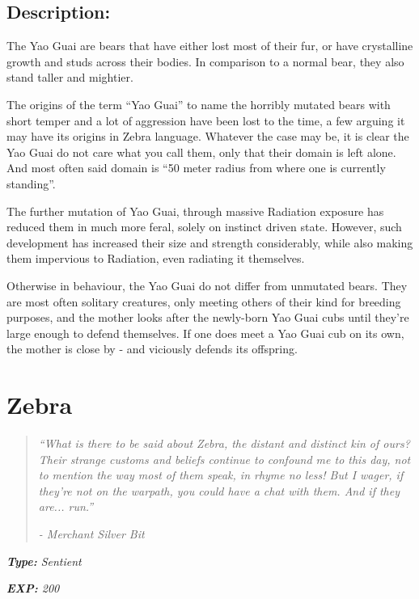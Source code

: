 \documentclass[11pt,a4paper,twocolumn]{book}
\begin{document}
	\subsection*{Description:}
	The Yao Guai are bears that have either lost most of their fur, or have crystalline growth and studs across their bodies. In comparison to a normal bear, they also stand taller and mightier.
	
	The origins of the term ``Yao Guai'' to name the horribly mutated bears with short temper and a lot of aggression have been lost to the time, a few arguing it may have its origins in Zebra language. Whatever the case may be, it is clear the Yao Guai do not care what you call them, only that their domain is left alone. And most often said domain is ``50 meter radius from where one is currently standing''. 
	
	The further mutation of Yao Guai, through massive Radiation exposure has reduced them in much more feral, solely on instinct driven state. However, such development has increased their size and strength considerably, while also making them impervious to Radiation, even radiating it themselves.
	
	Otherwise in behaviour, the Yao Guai do not differ from unmutated bears. They are most often solitary creatures, only meeting others of their kind for breeding purposes, and the mother looks after the newly-born Yao Guai cubs until they're large enough to defend themselves. If one does meet a Yao Guai cub on its own, the mother is close by - and viciously defends its offspring.
	
	\clearpage
	
	\section*{Zebra}
	\begin{quote}
		\emph{``What is there to be said about Zebra, the distant and distinct kin of ours? Their strange customs and beliefs continue to confound me to this day, not to mention the way most of them speak, in rhyme no less! But I wager, if they're not on the warpath, you could have a chat with them. And if they are... run.''}
		
		\emph{-	Merchant Silver Bit}
	\end{quote}
	
	\emph{\textbf{Type:} Sentient}
	
	\emph{\textbf{EXP:} 200}
	
\end{document}
